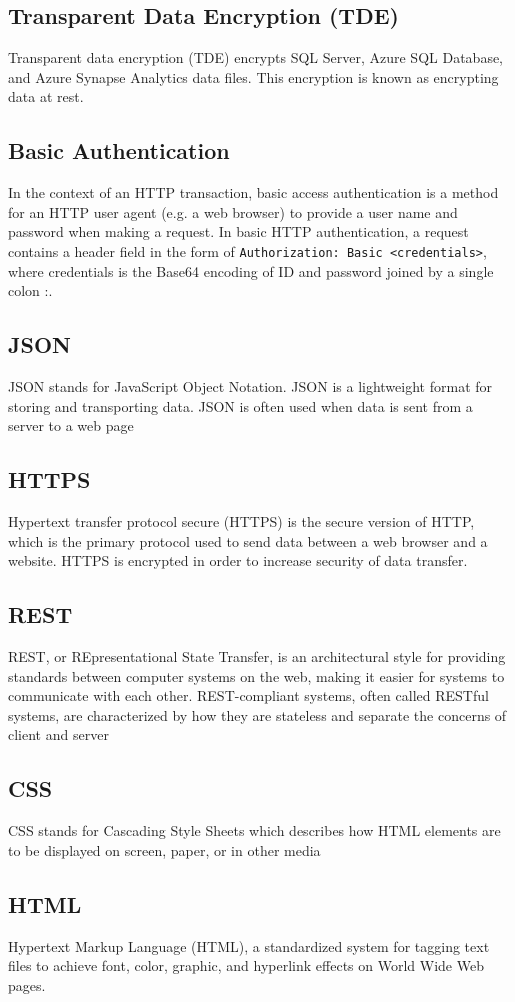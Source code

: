 \subsection*{Transparent Data Encryption (TDE)}
Transparent data encryption (TDE) encrypts SQL Server, Azure SQL Database, and Azure Synapse Analytics data files. This encryption is known as encrypting data at rest.
\subsection*{Basic Authentication}
In the context of an HTTP transaction, basic access authentication is a method for an HTTP user agent (e.g. a web browser) to provide a user name and password when making a request. In basic HTTP authentication, a request contains a header field in the form of \lstinline{Authorization: Basic <credentials>}, where credentials is the Base64 encoding of ID and password joined by a single colon :.
\subsection*{JSON}
JSON stands for JavaScript Object Notation. JSON is a lightweight format for storing and transporting data. JSON is often used when data is sent from a server to a web page
\subsection*{HTTPS}
Hypertext transfer protocol secure (HTTPS) is the secure version of HTTP, which is the primary protocol used to send data between a web browser and a website. HTTPS is encrypted in order to increase security of data transfer. 
\subsection*{REST}
REST, or REpresentational State Transfer, is an architectural style for providing standards between computer systems on the web, making it easier for systems to communicate with each other. REST-compliant systems, often called RESTful systems, are characterized by how they are stateless and separate the concerns of client and server
 \subsection*{CSS}
CSS stands for Cascading Style Sheets which describes how HTML elements are to be displayed on screen, paper, or in other media
\subsection*{HTML}
Hypertext Markup Language (HTML), a standardized system for tagging text files to achieve font, color, graphic, and hyperlink effects on World Wide Web pages.
